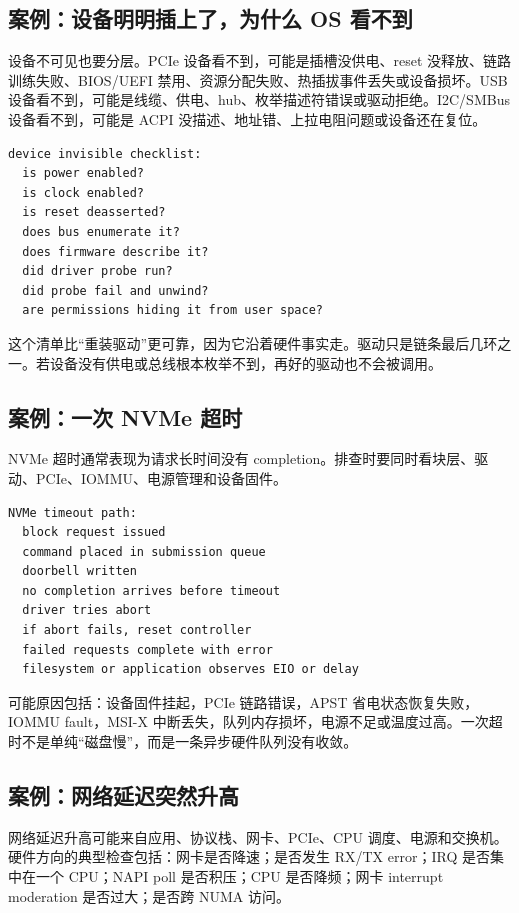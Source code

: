 \subsection{案例：设备明明插上了，为什么 OS 看不到}

设备不可见也要分层。PCIe 设备看不到，可能是插槽没供电、reset 没释放、链路训练失败、BIOS/UEFI 禁用、资源分配失败、热插拔事件丢失或设备损坏。USB 设备看不到，可能是线缆、供电、hub、枚举描述符错误或驱动拒绝。I2C/SMBus 设备看不到，可能是 ACPI 没描述、地址错、上拉电阻问题或设备还在复位。

\begin{lstlisting}
device invisible checklist:
  is power enabled?
  is clock enabled?
  is reset deasserted?
  does bus enumerate it?
  does firmware describe it?
  did driver probe run?
  did probe fail and unwind?
  are permissions hiding it from user space?
\end{lstlisting}

这个清单比“重装驱动”更可靠，因为它沿着硬件事实走。驱动只是链条最后几环之一。若设备没有供电或总线根本枚举不到，再好的驱动也不会被调用。

\subsection{案例：一次 NVMe 超时}

NVMe 超时通常表现为请求长时间没有 completion。排查时要同时看块层、驱动、PCIe、IOMMU、电源管理和设备固件。

\begin{lstlisting}
NVMe timeout path:
  block request issued
  command placed in submission queue
  doorbell written
  no completion arrives before timeout
  driver tries abort
  if abort fails, reset controller
  failed requests complete with error
  filesystem or application observes EIO or delay
\end{lstlisting}

可能原因包括：设备固件挂起，PCIe 链路错误，APST 省电状态恢复失败，IOMMU fault，MSI-X 中断丢失，队列内存损坏，电源不足或温度过高。一次超时不是单纯“磁盘慢”，而是一条异步硬件队列没有收敛。

\subsection{案例：网络延迟突然升高}

网络延迟升高可能来自应用、协议栈、网卡、PCIe、CPU 调度、电源和交换机。硬件方向的典型检查包括：网卡是否降速；是否发生 RX/TX error；IRQ 是否集中在一个 CPU；NAPI poll 是否积压；CPU 是否降频；网卡 interrupt moderation 是否过大；是否跨 NUMA 访问。

